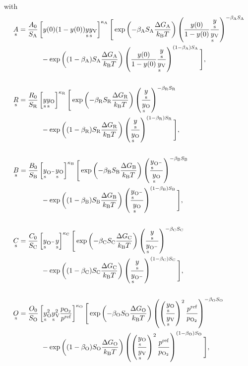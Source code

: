 \documentclass{article}
\numberwithin{equation}{section}
\newcommand{\us}[1]{\underset{\textrm{s}}{#1}{}}
\def\kB{k_\mathrm{B}}
\newcommand{\OO}{{\ce{O2}}}
\def\ys{\us y}
\newcommand{\ysV}{\us y_{\textrm{V}}}
\newcommand{\yOmin}{\us y_{\ce{O-}}}
\def\y0{y(0)}
\def\yOs{\us y_\textrm{O}}
\def\A0{A_0}
\def\B0{B_0}
\def\C0{C_0}
\def\R0{R_0}
\def\K0{O_0}
\def\DGA{\Delta G_\textrm{A}  }
\def\DGB{\Delta G_\textrm{B}  }
\def\DGC{\Delta G_\textrm{C}  }
\def\DGR{\Delta G_\textrm{R}  }
\def\DGO{\Delta G_\textrm{O}  }
\def\betaA{\beta_\textrm{A}}
\def\betaB{\beta_\textrm{B}}
\def\betaC{\beta_\textrm{C}}
\def\betaR{\beta_\textrm{R}}
\def\betaO{\beta_\textrm{O}}
\def\SA{S_\textrm{A}}
\def\SB{S_\textrm{B}}
\def\SC{S_\textrm{C}}
\def\SR{S_\textrm{R}}
\def\SO{S_\textrm{O}}
\newcommand{\kaA}{{\kappa_\textrm{A}}}
\newcommand{\kaB}{{\kappa_\textrm{B}}}
\newcommand{\kaC}{{\kappa_\textrm{C}}}
\newcommand{\kaR}{{\kappa_\textrm{R}}}
\newcommand{\kaO}{{\kappa_\textrm{O}}}
\def\REF{\textrm{ref}}
\begin{document}
with
\begin{subequations}
\begin{align}
&\us A
=
\frac{\A0}{\SA}
\left[
    y(0) (1-y(0)) \ys \ysV  
\right]^\kaA
\Bigg[
	\exp
	\left(
		{-\betaA \SA \frac{\DGA}{\kB T}}
	\right)
	\left(
		\frac{\y0}{1 - \y0}
		\frac{\ys}{\ysV}
	\right)^{-\betaA \SA}
\\ \nonumber
	&\quad \quad \quad \quad	
	-
	\exp
	\left(
		{(1-\betaA) \SA \frac{\DGA}{\kB T}}
	\right)
	\left(
		\frac{\y0}{1 - \y0 }
		\frac{\ys}{\ysV}
	\right)^{(1-\betaA) \SA}
\Bigg],
\\ \nonumber
\\
&\us R
=
\frac{\R0}{\SR}
\left[
  \ys \yOs 
\right]^\kaR
\Bigg[
	\exp
	\left(
		{-\betaR \SR \frac{\DGR}{\kB T}}
	\right)
	\left(
		\frac{\ys}{\yOs}
	\right)^{-\betaR \SR}
\\ \nonumber
	& \quad \quad \quad \quad	
	-
	\exp
	\left(
		{(1 - \betaR) \SR \frac{\DGR}{\kB T}}
	\right)
	\left(
		\frac{\ys}{\yOs}
	\right)^{(1-\betaR) \SR}
\Bigg],
\\ \nonumber
\\
&\us B
=
\frac{\B0}{\SB}
\left[
  \yOmin \yOs 
\right]^\kaB
\Bigg[
	\exp
	\left(
		{-\betaB \SB \frac{\DGB}{\kB T}}
	\right)
	\left(
		\frac{\yOmin}{\yOs}
	\right)^{-\betaB \SB}
\\ \nonumber
	& \quad \quad \quad \quad	
	-
	\exp
	\left(
		{(1 - \betaB) \SB \frac{\DGB}{\kB T}}
	\right)
	\left(
		\frac{\yOmin}{\yOs}
	\right)^{(1-\betaB) \SB}
\Bigg],
\\ \nonumber
\\
&\us C
=
\frac{\C0}{\SC}
\left[
  \yOmin \ys 
\right]^\kaC
\Bigg[
	\exp
	\left(
		{-\betaC \SC \frac{\DGC}{\kB T}}
	\right)
	\left(
		\frac{\ys}{\yOmin}
	\right)^{-\betaC \SC}
\\ \nonumber
	& \quad \quad \quad \quad	
	-
	\exp
	\left(
		{(1 - \betaC) \SC \frac{\DGC}{\kB T}}
	\right)
	\left(
		\frac{\ys}{\yOmin}
	\right)^{(1-\betaC) \SC}
\Bigg],
\\ \nonumber
\\
&\us O
=
\frac{\K0}{\SO}
\left[
    \yOs^2 \ysV^2 \frac{p_\OO}{p^\REF}
\right]^\kaO
\Bigg[
	\exp
	\left(
		{-\betaO \SO \frac{\DGO}{\kB T}}
	\right)
	\left(
		\left(
			\frac{\yOs}{\ysV}
		\right)^2
   \frac{p^\REF}{p_\OO}
	\right)^{-\betaO \SO}
\\ \nonumber
	&\quad \quad \quad \quad	
	-
	\exp
	\left(
		{(1-\betaO) \SO \frac{\DGO}{\kB T}}
	\right)
	\left(
		\left(
			\frac{\yOs}{\ysV}
		\right)^2
    \frac{p^\REF}{p_\OO}
	\right)^{(1 - \betaO) \SO}
\Bigg],
\end{align}
\end{subequations}
\end{document}
